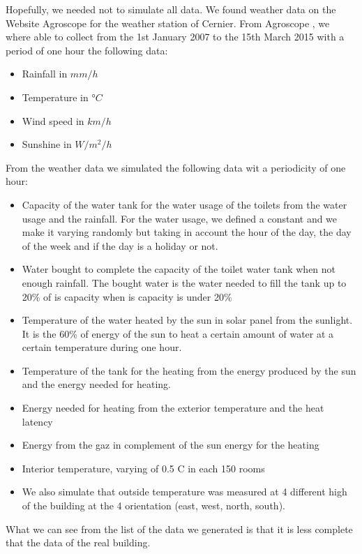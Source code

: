 \documentclass{acm_proc_article-sp}
\begin{document}
Hopefully, we needed not to simulate all data. We found weather data on the Website Agroscope for the weather station of Cernier. From Agroscope \cite{agroscope}, we where able to collect from the 1st January 2007 to the 15th March 2015 with a period of one hour the following data:

\begin{itemize}
\item Rainfall in \(mm/h\)
\item Temperature in \(°C\)
\item Wind speed in \(km/h\)
\item Sunshine in \(W/m^2/h\)
\end{itemize}

From the weather data we simulated the following data wit a periodicity of one hour:

\begin{itemize}
\item Capacity of the water tank for the water usage of the toilets from the water usage and the rainfall. For the water usage, we defined a constant and we make it varying randomly but taking in account the hour of the day, the day of the week and if the day is a holiday or not.
\item Water bought to complete the capacity of the toilet water tank when not enough rainfall. The bought water is the water needed to fill the tank up to 20\% of is capacity when is capacity is under 20\%
 \item Temperature of the water heated by the sun in solar panel from the sunlight. It is the 60\% of energy of the sun to heat a certain amount of water at a certain temperature during one hour.
\item Temperature of the tank for the heating from the energy produced by the sun and the energy needed for heating.
\item Energy needed for heating from the exterior temperature and the heat latency
\item Energy from the gaz in complement of the sun energy for the heating
\item Interior temperature, varying of 0.5 \degree C in each 150 rooms
\item We also simulate that outside temperature was measured at 4 different high of the building at the 4 orientation (east, west, north, south).
\end{itemize}

What we can see from the list of the data we generated is that it is less complete that the data of the real building.
\end{document}
